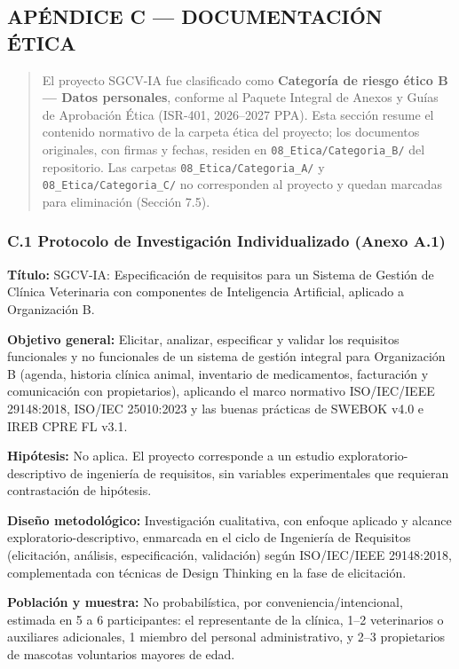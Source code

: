 \documentclass[
]{article}
\begin{document}
\subsection{APÉNDICE C --- DOCUMENTACIÓN ÉTICA}\label{apendice-c-documentacion-etica}

\begin{quote}
El proyecto SGCV-IA fue clasificado como \textbf{Categoría de riesgo ético B --- Datos personales}, conforme al Paquete Integral de Anexos y Guías de Aprobación Ética (ISR-401, 2026--2027 PPA). Esta sección resume el contenido normativo de la carpeta ética del proyecto; los documentos originales, con firmas y fechas, residen en \texttt{08\_Etica/Categoria\_B/} del repositorio. Las carpetas \texttt{08\_Etica/Categoria\_A/} y \texttt{08\_Etica/Categoria\_C/} no corresponden al proyecto y quedan marcadas para eliminación (Sección 7.5).
\end{quote}

\subsubsection{C.1 Protocolo de Investigación Individualizado (Anexo A.1)}\label{c1-protocolo-investigacion}

\textbf{Título:} SGCV-IA: Especificación de requisitos para un Sistema de Gestión de Clínica Veterinaria con componentes de Inteligencia Artificial, aplicado a Organización B.

\textbf{Objetivo general:} Elicitar, analizar, especificar y validar los requisitos funcionales y no funcionales de un sistema de gestión integral para Organización B (agenda, historia clínica animal, inventario de medicamentos, facturación y comunicación con propietarios), aplicando el marco normativo ISO/IEC/IEEE 29148:2018, ISO/IEC 25010:2023 y las buenas prácticas de SWEBOK v4.0 e IREB CPRE FL v3.1.

\textbf{Hipótesis:} No aplica. El proyecto corresponde a un estudio exploratorio-descriptivo de ingeniería de requisitos, sin variables experimentales que requieran contrastación de hipótesis.

\textbf{Diseño metodológico:} Investigación cualitativa, con enfoque aplicado y alcance exploratorio-descriptivo, enmarcada en el ciclo de Ingeniería de Requisitos (elicitación, análisis, especificación, validación) según ISO/IEC/IEEE 29148:2018, complementada con técnicas de Design Thinking en la fase de elicitación.

\textbf{Población y muestra:} No probabilística, por conveniencia/intencional, estimada en 5 a 6 participantes: el representante de la clínica, 1--2 veterinarios o auxiliares adicionales, 1 miembro del personal administrativo, y 2--3 propietarios de mascotas voluntarios mayores de edad.
\end{document}
